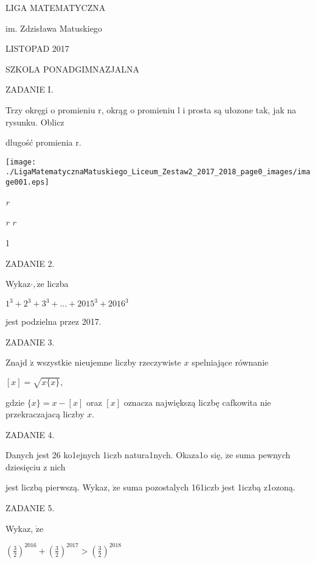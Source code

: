 \documentclass[a4paper,12pt]{article}
\begin{document}
LIGA MATEMATYCZNA

im. Zdzisława Matuskiego

LISTOPAD 2017

SZKOLA PONADGIMNAZJALNA

ZADANIE I.

Trzy okręgi o promieniu r, okrąg o promieniu l i prosta są ułozone tak, jak na rysunku. Oblicz

dlugość promienia r.
\begin{center}
\texttt{[image: ./LigaMatematycznaMatuskiego\_Liceum\_Zestaw2\_2017\_2018\_page0\_images/image001.eps]}
\end{center}
{\it r}

{\it r  r}

1

ZADANIE 2.

Wykaz$\cdot, \dot{\mathrm{z}}\mathrm{e}$ liczba

$1^{3}+2^{3}+3^{3}+\ldots+2015^{3}+2016^{3}$

jest podzielna przez 2017.

ZADANIE 3.

Znajd $\acute{\mathrm{z}}$ wszystkie nieujemne liczby rzeczywiste $x$ spelniające równanie

$[x]=\sqrt{x\{x\}},$

gdzie $\{x\}=x-[x]$ oraz $[x]$ oznacza największą liczbę cafkowita nie przekraczajacą liczby $x.$

ZADANIE 4.

Danych jest 26 ko1ejnych 1iczb natura1nych. Okaza1o się, $\dot{\mathrm{z}}\mathrm{e}$ suma pewnych dziesięciu z nich

jest liczbą pierwszą. Wykaz, $\dot{\mathrm{z}}\mathrm{e}$ suma pozostalych 161iczb jest 1iczbą z1ozoną.

ZADANIE 5.

Wykaz, $\dot{\mathrm{z}}\mathrm{e}$

$(\displaystyle \frac{3}{2})^{2016}+(\frac{3}{2})^{2017}>(\frac{3}{2})^{2018}$
\end{document}
